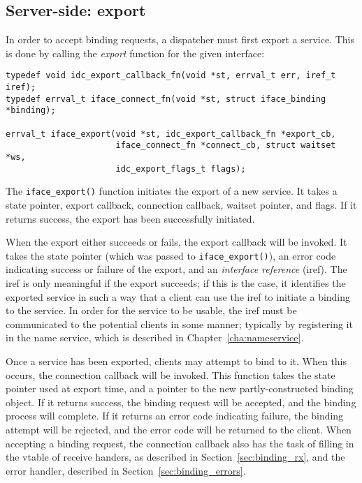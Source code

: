 \documentclass[a4paper,twoside]{report} %
\begin{document}
\subsection{Server-side: export}

In order to accept binding requests, a dispatcher must first export a service.
This is done by calling the \emph{export} function for the given interface:

\begin{lstlisting}
typedef void idc_export_callback_fn(void *st, errval_t err, iref_t iref);
typedef errval_t iface_connect_fn(void *st, struct iface_binding *binding);

errval_t iface_export(void *st, idc_export_callback_fn *export_cb,
                      iface_connect_fn *connect_cb, struct waitset *ws,
                      idc_export_flags_t flags);
\end{lstlisting}

The \lstinline+iface_export()+ function initiates the export of a new service.
It takes a state pointer, export callback, connection callback, waitset
pointer, and flags. If it returns success, the export has been successfully
initiated.

When the export either succeeds or fails, the export callback will be invoked. 
It takes the state pointer (which was passed to \lstinline+iface_export()+), an
error code indicating success or failure of the export, and an \emph{interface
reference} (iref). The iref is only meaningful if the export succeeds; if this
is the case, it identifies the exported service in such a way that a client can
use the iref to initiate a binding to the service. In order for the service to
be usable, the iref must be communicated to the potential clients in some
manner; typically by registering it in the name service, which is described in
Chapter~\ref{cha:nameservice}.

Once a service has been exported, clients may attempt to bind to it. When this
occurs, the connection callback will be invoked. This function takes the state
pointer used at export time, and a pointer to the new partly-constructed binding
object. If it returns success, the binding request will be accepted, and the
binding process will complete. If it returns an error code indicating failure,
the binding attempt will be rejected, and the error code will be returned to
the client. When accepting a binding request, the connection callback also has
the task of filling in the vtable of receive handers, as described in
Section~\ref{sec:binding_rx}, and the error handler, described in
Section~\ref{sec:binding_errors}.
\end{document}
